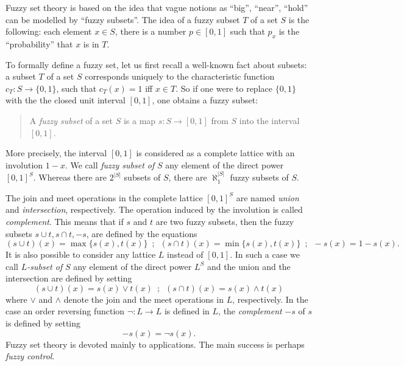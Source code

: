 \documentclass[12pt]{article}
\begin{document}
Fuzzy set theory is based on the idea that vague notions as ``big'', ``near'', ``hold'' can be modelled by ``fuzzy subsets''.  The idea of a fuzzy subset $T$ of a set $S$ is the following: each element $x\in S$, there is a number $p\in [0,1]$ such that $p_x$ is the ``probability'' that $x$ is in $T$.  

To formally define a fuzzy set, let us first recall a well-known fact about subsets: a subset $T$ of a set $S$ corresponds uniquely to the characteristic function $c_T:S\to \lbrace 0,1\rbrace$, such that $c_T(x)=1$ iff $x\in T$.  So if one were to replace $\lbrace 0,1\rbrace$ with the the closed unit interval $[0,1]$, one obtains a fuzzy subset:
\begin{quote}
A \emph{fuzzy subset} of a set $S$ is a map $s:S\rightarrow [0,1]$ from $S$ into the interval $[0,1]$. 
\end{quote}
More precisely, the interval $[0,1]$ is considered as a complete lattice with an involution $1-x$. 
We call \textit{fuzzy subset of } $S$ any element of the direct power $[0,1]^S$.  Whereas there are $2^{|S|}$ subsets of $S$, there are $\aleph_1^{|S|}$ fuzzy subsets of $S$.

The join and meet operations in the complete lattice $[0,1]^S$ are named \textit{union} and \textit{intersection}, respectively. The operation induced by the involution is called \textit{complement}. This means that if $s$ and $t$ are two fuzzy subsets, then the fuzzy subsets $s\cup t, s\cap t, -s$, are defined by the equations
$$(s\cup t)(x) = \max\{s(x), t(x)\} \,\,\, ; \,\,\,(s\cap t)(x) = \min\{s(x), t(x)\} \,\,\, ; \,\,\,-s(x) = 1-s(x).$$
It is also possible to consider any lattice $L$ instead of $[0,1]$. In such a case we call $L$\textit{-subset of } $S$ any element of the direct power $L^S$ and the union and the intersection are defined by setting
$$(s\cup t)(x) = s(x)\vee t(x) \,\,\, ; \,\,\,(s\cap t)(x) = s(x)\wedge t(x)$$
where $\vee$ and $\wedge$ denote the join and the meet operations in $L$, respectively. In the case an order reversing function $\neg : L \rightarrow L$ is defined in $L$, the \textit{complement} $-s$ of $s$ is defined by setting
$$-s(x) = \neg s(x).$$
Fuzzy set theory is devoted mainly to applications. The main success is perhaps \textit{fuzzy control}.
\end{document}
